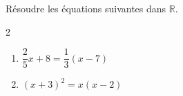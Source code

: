 \begin{exo}{}
	Résoudre les équations suivantes dans $\mathbb{R}$.

	\vspace*{-2mm}
	\begin{multicols}{2}
		\begin{enumerate}
			\item $\dfrac{2}{5}x + 8 = \dfrac{1}{3}(x - 7)$
			\item $(x + 3)^2 = x(x - 2)$
		\end{enumerate}
	\end{multicols}\vspace*{-2mm}
\end{exo}
